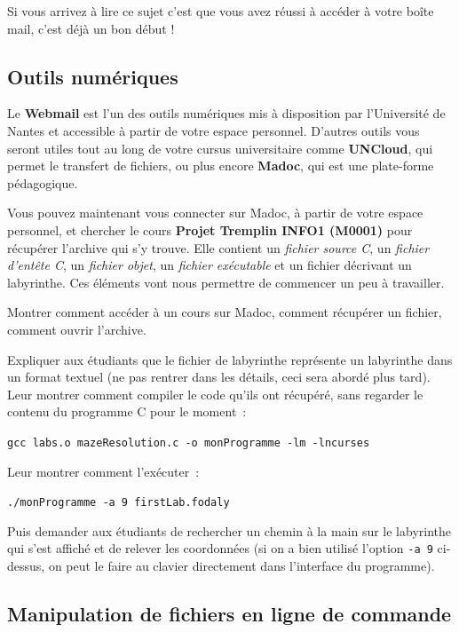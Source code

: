 \documentclass[a4paper]{article}
\newenvironment{enseignants}[1]{\noindent\color{blue}{\bf #1}}{}
\begin{document}
Si vous arrivez à lire ce sujet c’est que vous avez réussi à accéder à votre boîte mail, c’est déjà un bon début !

\subsection{Outils numériques}

Le \textbf{Webmail} est l’un des outils numériques mis à disposition par l’Université de Nantes et accessible à partir de votre espace personnel. D’autres outils vous seront utiles tout au long de votre cursus universitaire comme \textbf{UNCloud}, qui permet le transfert de fichiers, ou plus encore \textbf{Madoc}, qui est une plate-forme pédagogique.

Vous pouvez maintenant vous connecter sur Madoc, à partir de votre espace personnel, et chercher le cours \textbf{Projet Tremplin INFO1 (M0001)} pour récupérer l'archive qui s'y trouve. Elle contient un \emph{fichier source C}, un \emph{fichier d'entête C}, un \emph{fichier objet}, un \emph{fichier exécutable} et un fichier décrivant un labyrinthe. Ces éléments vont nous permettre de commencer un peu à travailler.

\begin{enseignants}{Madoc~:}
  Montrer comment accéder à un cours sur Madoc, comment récupérer un fichier, comment ouvrir l'archive.
\end{enseignants}

\begin{enseignants}{}
  Expliquer aux étudiants que le fichier de labyrinthe représente un labyrinthe dans un format textuel (ne pas rentrer dans les détails, ceci sera abordé plus tard).
  Leur montrer comment compiler le code qu'ils ont récupéré, sans regarder le contenu du programme C pour le moment~:

  \verb|gcc labs.o mazeResolution.c -o monProgramme -lm -lncurses|

  Leur montrer comment l'exécuter~:

  \verb|./monProgramme -a 9 firstLab.fodaly|

  Puis demander aux étudiants de rechercher un chemin à la main sur le labyrinthe qui s'est affiché et de relever les coordonnées (si on a bien utilisé l'option \verb|-a 9| ci-dessus, on peut le faire au clavier directement dans l'interface du programme).
\end{enseignants}

\subsection{Manipulation de fichiers en ligne de commande}
\end{document}
